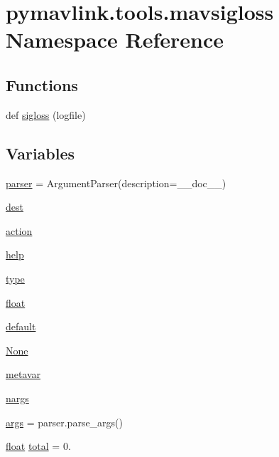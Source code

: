 \hypertarget{namespacepymavlink_1_1tools_1_1mavsigloss}{}\section{pymavlink.\+tools.\+mavsigloss Namespace Reference}
\label{namespacepymavlink_1_1tools_1_1mavsigloss}
\subsection*{Functions}
\begin{DoxyCompactItemize}
\item 
def \mbox{\hyperlink{namespacepymavlink_1_1tools_1_1mavsigloss_a15d6bb0d2eb142440ea44a1feb3b7b8c}{sigloss}} (logfile)
\end{DoxyCompactItemize}
\subsection*{Variables}
\begin{DoxyCompactItemize}
\item 
\mbox{\hyperlink{namespacepymavlink_1_1tools_1_1mavsigloss_adcd655ad86a93f066e9a4adbbc37260a}{parser}} = Argument\+Parser(description=\+\_\+\+\_\+doc\+\_\+\+\_\+)
\item 
\mbox{\hyperlink{namespacepymavlink_1_1tools_1_1mavsigloss_aaeeba6755f80fe768b355a91c496ce51}{dest}}
\item 
\mbox{\hyperlink{namespacepymavlink_1_1tools_1_1mavsigloss_ad5ed1d848b78690512c9985b9b047b59}{action}}
\item 
\mbox{\hyperlink{namespacepymavlink_1_1tools_1_1mavsigloss_a21210a1523365802d073cdafa8107869}{help}}
\item 
\mbox{\hyperlink{namespacepymavlink_1_1tools_1_1mavsigloss_a9683370da882fc72e8d520c009ba10f9}{type}}
\item 
\mbox{\hyperlink{namespacepymavlink_1_1tools_1_1mavsigloss_a580bca440e4e110cd01f2c03a3974ca3}{float}}
\item 
\mbox{\hyperlink{namespacepymavlink_1_1tools_1_1mavsigloss_a1f685e8d620ade3e1cf337b75c589ebc}{default}}
\item 
\mbox{\hyperlink{namespacepymavlink_1_1tools_1_1mavsigloss_ab349e444598f01453f01a7c6220ea5ba}{None}}
\item 
\mbox{\hyperlink{namespacepymavlink_1_1tools_1_1mavsigloss_a7c11ba9cd7194a1ed990689d7333530c}{metavar}}
\item 
\mbox{\hyperlink{namespacepymavlink_1_1tools_1_1mavsigloss_a62a71c95b15ac8435ca4ab32f42fbcc7}{nargs}}
\item 
\mbox{\hyperlink{namespacepymavlink_1_1tools_1_1mavsigloss_a48978a9ae0e95f156dd73c139f94f7c9}{args}} = parser.\+parse\+\_\+args()
\item 
\mbox{\hyperlink{namespacepymavlink_1_1tools_1_1mavsigloss_a580bca440e4e110cd01f2c03a3974ca3}{float}} \mbox{\hyperlink{namespacepymavlink_1_1tools_1_1mavsigloss_a6feee5cb03fa0acb15f105598258087b}{total}} = 0.
\end{DoxyCompactItemize}


